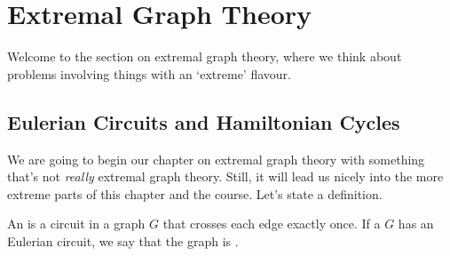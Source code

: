 \section{Extremal Graph Theory}

Welcome to the section on extremal graph theory, where we think about problems involving things with an `extreme' flavour.

\subsection{Eulerian Circuits and Hamiltonian Cycles}

We are going to begin our chapter on extremal graph theory with something that's not \emph{really} extremal graph theory. Still, it will lead us nicely into the more extreme parts of this chapter and the course. Let's state a definition.

\begin{definition}
	An  is a circuit in a graph $G$ that crosses each edge exactly once. If a $G$ has an Eulerian circuit, we say that the graph is .
\end{definition}


